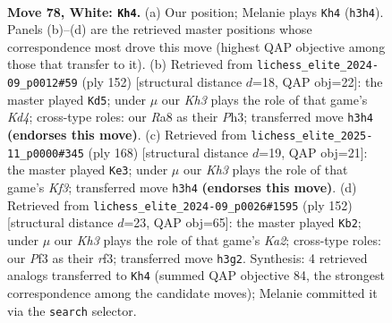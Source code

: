 \documentclass[11pt]{article}
\begin{document}
\clearpage

\begin{figure}[p]\centering
\begin{subfigure}{0.46\textwidth}\centering
\resizebox{\linewidth}{!}{%
\newchessgame
\chessboard[
  setfen={R7/4rp2/2R1p1k1/8/P3P3/5P1K/8/8 w - - 47 78},
  showmover=false,
  pgfstyle=straightmove, color=movearrow, markmove={h3-h4}
]}
\caption{}
\end{subfigure}\hfill
\begin{subfigure}{0.46\textwidth}\centering
\resizebox{\linewidth}{!}{%
\newchessgame
\chessboard[
  setfen={8/r3k3/5p2/p4Pp1/R2K4/6PP/8/8 w - - 1 77},
  showmover=false,
  pgfstyle=straightmove, color=movearrow, markmove={d4-d5}
]}
\caption{}
\end{subfigure}
\\[4pt]
\begin{subfigure}{0.46\textwidth}\centering
\resizebox{\linewidth}{!}{%
\newchessgame
\chessboard[
  setfen={8/8/r5p1/4k2p/7P/5KP1/p7/R7 w - - 8 85},
  showmover=false,
  pgfstyle=straightmove, color=movearrow, markmove={f3-e3}
]}
\caption{}
\end{subfigure}\hfill
\begin{subfigure}{0.46\textwidth}\centering
\resizebox{\linewidth}{!}{%
\newchessgame
\chessboard[
  setfen={4r3/8/2pkp2R/8/P2PR3/5r2/K7/8 w - - 9 77},
  showmover=false,
  pgfstyle=straightmove, color=movearrow, markmove={a2-b2}
]}
\caption{}
\end{subfigure}
\caption{\textbf{Move 78, White: \texttt{Kh4}.} (a) Our position; Melanie plays \texttt{Kh4} (\texttt{h3h4}). Panels (b)--(d) are the retrieved master positions whose correspondence most drove this move (highest QAP objective among those that transfer to it). (b) Retrieved from \texttt{lichess\_elite\_2024-09\_p0012\#59} (ply 152) [structural distance $d$=18, QAP obj=22]: the master played \texttt{Kd5}; under $\mu$ our \emph{Kh3} plays the role of that game's \emph{Kd4}; cross-type roles: our \emph{R}a8 as their \emph{P}h3; transferred move \texttt{h3h4} \textbf{(endorses this move)}. (c) Retrieved from \texttt{lichess\_elite\_2025-11\_p0000\#345} (ply 168) [structural distance $d$=19, QAP obj=21]: the master played \texttt{Ke3}; under $\mu$ our \emph{Kh3} plays the role of that game's \emph{Kf3}; transferred move \texttt{h3h4} \textbf{(endorses this move)}. (d) Retrieved from \texttt{lichess\_elite\_2024-09\_p0026\#1595} (ply 152) [structural distance $d$=23, QAP obj=65]: the master played \texttt{Kb2}; under $\mu$ our \emph{Kh3} plays the role of that game's \emph{Ka2}; cross-type roles: our \emph{P}f3 as their \emph{r}f3; transferred move \texttt{h3g2}. Synthesis: 4 retrieved analogs transferred to \texttt{Kh4} (summed QAP objective 84, the strongest correspondence among the candidate moves); Melanie committed it via the \texttt{search} selector.}
\label{fig:thought-m154}
\end{figure}
\end{document}
